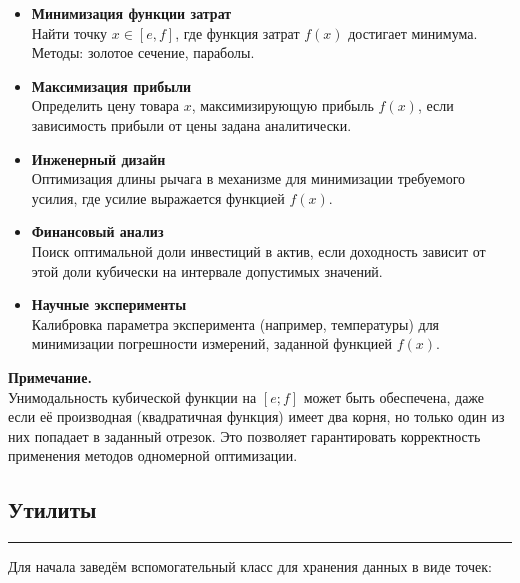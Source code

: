 \documentclass[a4paper, 14pt]{extarticle}
\begin{document}
\begin{itemize}
    \item \textbf{Минимизация функции затрат}\\ 
    Найти точку $x \in [e, f]$, где функция затрат $f(x)$ достигает минимума. 
    Методы: золотое сечение, параболы. \\

    \item \textbf{Максимизация прибыли}\\ 
    Определить цену товара $x$, максимизирующую прибыль $f(x)$, 
    если зависимость прибыли от цены задана аналитически. \\

    \item \textbf{Инженерный дизайн}\\ 
    Оптимизация длины рычага в механизме для минимизации требуемого усилия, 
    где усилие выражается функцией $f(x)$. \\

    \item \textbf{Финансовый анализ}\\ 
    Поиск оптимальной доли инвестиций в актив, если доходность зависит от 
    этой доли кубически на интервале допустимых значений. \\

    \item \textbf{Научные эксперименты}\\ 
    Калибровка параметра эксперимента (например, температуры) для минимизации 
    погрешности измерений, заданной функцией $f(x)$. \\
\end{itemize}
\vspace{20pt}
\textbf{\normalsize Примечание.}\\[0.5em]

Унимодальность кубической функции на $[e;f]$ может быть обеспечена, 
даже если её производная (квадратичная функция) имеет два корня, но 
только один из них попадает в заданный отрезок. Это позволяет гарантировать 
корректность применения методов одномерной оптимизации.

\subsection*{Утилиты}\vspace{-20pt}\rule{\linewidth}{0.1mm}

Для начала заведём вспомогательный класс для хранения данных в виде точек:
\end{document}

